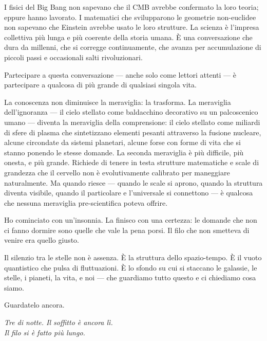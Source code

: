 \documentclass[12pt,a4paper,openany]{book}
\begin{document}
I fisici del Big Bang non sapevano che il CMB avrebbe confermato la loro teoria; eppure hanno lavorato. I matematici che svilupparono le geometrie non-euclidee non sapevano che Einstein avrebbe usato le loro strutture. La scienza è l'impresa collettiva più lunga e più coerente della storia umana. È una conversazione che dura da millenni, che si corregge continuamente, che avanza per accumulazione di piccoli passi e occasionali salti rivoluzionari.

Partecipare a questa conversazione --- anche solo come lettori attenti --- è partecipare a qualcosa di più grande di qualsiasi singola vita.

\medskip

La conoscenza non diminuisce la meraviglia: la trasforma. La meraviglia dell'ignoranza --- il cielo stellato come baldacchino decorativo su un palcoscenico umano --- diventa la meraviglia della comprensione: il cielo stellato come miliardi di sfere di plasma che sintetizzano elementi pesanti attraverso la fusione nucleare, alcune circondate da sistemi planetari, alcune forse con forme di vita che si stanno ponendo le stesse domande. La seconda meraviglia è più difficile, più onesta, e più grande. Richiede di tenere in testa strutture matematiche e scale di grandezza che il cervello non è evolutivamente calibrato per maneggiare naturalmente. Ma quando riesce --- quando le scale si aprono, quando la struttura diventa visibile, quando il particolare e l'universale si connettono --- è qualcosa che nessuna meraviglia pre-scientifica poteva offrire.

Ho cominciato con un'insonnia. La finisco con una certezza: le domande che non ci fanno dormire sono quelle che vale la pena porsi. Il filo che non smetteva di venire era quello giusto.

Il silenzio tra le stelle non è assenza. È la struttura dello spazio-tempo. È il vuoto quantistico che pulsa di fluttuazioni. È lo sfondo su cui si staccano le galassie, le stelle, i pianeti, la vita, e noi --- che guardiamo tutto questo e ci chiediamo cosa siamo.

Guardatelo ancora.

\medskip

\begin{center}
\itshape
Tre di notte. Il soffitto è ancora lì.\\
Il filo si è fatto più lungo.\\[0.5em]
\normalfont
\end{center}

\end{document}
